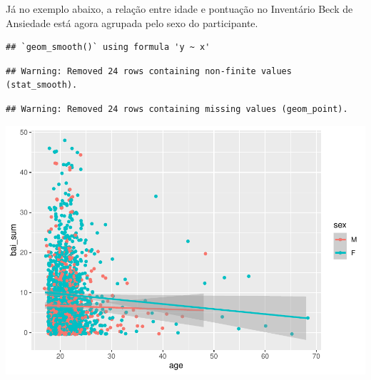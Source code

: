 \documentclass[
]{book}
\newenvironment{Shaded}{\begin{snugshade}}{\end{snugshade}}
\newcommand{\DataTypeTok}[1]{\textcolor[rgb]{0.13,0.29,0.53}{#1}}
\newcommand{\KeywordTok}[1]{\textcolor[rgb]{0.13,0.29,0.53}{\textbf{#1}}}
\newcommand{\NormalTok}[1]{#1}
\newcommand{\OperatorTok}[1]{\textcolor[rgb]{0.81,0.36,0.00}{\textbf{#1}}}
\newcommand{\StringTok}[1]{\textcolor[rgb]{0.31,0.60,0.02}{#1}}
\begin{document}
Já no exemplo abaixo, a relação entre idade e pontuação no Inventário Beck de Ansiedade está agora agrupada pelo sexo do participante.

\begin{Shaded}
\end{Shaded}

\begin{verbatim}
## `geom_smooth()` using formula 'y ~ x'
\end{verbatim}

\begin{verbatim}
## Warning: Removed 24 rows containing non-finite values (stat_smooth).
\end{verbatim}

\begin{verbatim}
## Warning: Removed 24 rows containing missing values (geom_point).
\end{verbatim}

\begin{center}\includegraphics{gitbook-demo_files/figure-latex/unnamed-chunk-26-1} \end{center}
\end{document}
